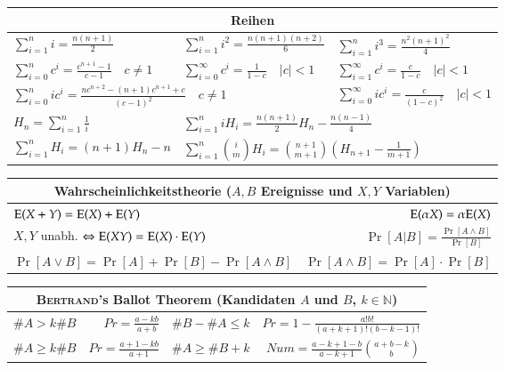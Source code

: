 \begin{tabular}{l|l|l}
	\toprule
	\multicolumn{3}{c}{Reihen} \\
	\midrule
	$\sum\limits_{i = 1}^n i = \frac{n(n+1)}{2}$ &
	$\sum\limits_{i = 1}^n i^2 = \frac{n(n + 1)(n + 2)}{6}$ & 
	$\sum\limits_{i = 1}^n i^3 = \frac{n^2 (n + 1)^2}{4}$ \\

	$\sum\limits_{i = 0}^n c^i = \frac{c^{n + 1} - 1}{c - 1} \quad c \neq 1$ &
	$\sum\limits_{i = 0}^\infty c^i = \frac{1}{1 - c} \quad \vert c \vert < 1$ &
	$\sum\limits_{i = 1}^\infty c^i = \frac{c}{1 - c} \quad \vert c \vert < 1$ \\

	\multicolumn{2}{l|}{
		$\sum\limits_{i = 0}^n ic^i = \frac{nc^{n + 2} - (n + 1)c^{n + 1} + c}{(c - 1)^2} \quad c \neq 1$
	} &
	$\sum\limits_{i = 0}^\infty ic^i = \frac{c}{(1 - c)^2} \quad \vert c \vert < 1$ \\

	$H_n = \sum\limits_{i = 1}^n \frac{1}{i}$ &
	\multicolumn{2}{l}{
		$\sum\limits_{i = 1}^n iH_i = \frac{n(n + 1)}{2}H_n - \frac{n(n - 1)}{4}$
	} \\

	$\sum\limits_{i = 1}^n H_i = (n + 1)H_n - n$ &
	\multicolumn{2}{l}{
		$\sum\limits_{i = 1}^n \binom{i}{m}H_i =
		\binom{n + 1}{m + 1} \left(H_{n + 1} - \frac{1}{m  + 1}\right)$
	} \\
	\bottomrule
\end{tabular}
\vspace{1mm}

\begin{tabular}{l|r}
	\toprule
	\multicolumn{2}{c}{
		Wahrscheinlichkeitstheorie ($A,B$ Ereignisse und $X,Y$ Variablen)
	} \\
	\midrule
	$\text{E}(X + Y) = \text{E}(X) + \text{E}(Y)$ &
	$\text{E}(\alpha X) = \alpha \text{E}(X)$ \\

	$X, Y$ unabh. $\Leftrightarrow \text{E}(XY) = \text{E}(X) \cdot \text{E}(Y)$ &
	$\Pr[A \vert B] = \frac{\Pr[A \land B]}{\Pr[B]}$ \\

	$\Pr[A \lor B] = \Pr[A] + \Pr[B] - \Pr[A \land B]$ &
	$\Pr[A \land B] = \Pr[A] \cdot \Pr[B]$ \\
	\bottomrule
\end{tabular}
\vspace{1mm}

\begin{tabular}{lr|lr}
	\toprule
	\multicolumn{4}{c}{\textsc{Bertrand}'s Ballot Theorem (Kandidaten $A$ und $B$, $k \in \mathbb{N}$)} \\
	\midrule
	$\#A > k\#B$ & $Pr = \frac{a - kb}{a + b}$ &
	$\#B - \#A \leq k$ & $Pr = 1 - \frac{a!b!}{(a + k + 1)!(b - k - 1)!}$ \\

	$\#A \geq k\#B$ & $Pr = \frac{a + 1 - kb}{a + 1}$ &
	$\#A \geq \#B + k$ & $Num = \frac{a - k + 1 - b}{a - k + 1} \binom{a + b - k}{b}$ \\
	\bottomrule
\end{tabular}
\vspace{5mm}

